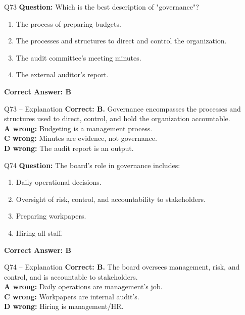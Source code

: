 \documentclass[aspectratio=169,10pt]{beamer}
\begin{document}
	\begin{frame}[t]{Q73}
		\small
		\textbf{Question:} Which is the best description of "governance"?
		\begin{enumerate}[label=\Alph*.,itemsep=1pt,topsep=2pt]
			\item The process of preparing budgets.
			\item The processes and structures to direct and control the organization.
			\item The audit committee's meeting minutes.
			\item The external auditor's report.
		\end{enumerate}
		\vspace{4pt}
		\textbf{Correct Answer: B}
	\end{frame}
	
	\begin{frame}[t]{Q73 -- Explanation}
		\small
		\textbf{Correct: B.} Governance encompasses the processes and structures used to direct, control, and hold the organization accountable. \\[4pt]
		\textbf{A wrong:} Budgeting is a management process. \\[2pt]
		\textbf{C wrong:} Minutes are evidence, not governance. \\[2pt]
		\textbf{D wrong:} The audit report is an output.
	\end{frame}
	
	\begin{frame}[t]{Q74}
		\small
		\textbf{Question:} The board's role in governance includes:
		\begin{enumerate}[label=\Alph*.,itemsep=1pt,topsep=2pt]
			\item Daily operational decisions.
			\item Oversight of risk, control, and accountability to stakeholders.
			\item Preparing workpapers.
			\item Hiring all staff.
		\end{enumerate}
		\vspace{4pt}
		\textbf{Correct Answer: B}
	\end{frame}
	
	\begin{frame}[t]{Q74 -- Explanation}
		\small
		\textbf{Correct: B.} The board oversees management, risk, and control, and is accountable to stakeholders. \\[4pt]
		\textbf{A wrong:} Daily operations are management's job. \\[2pt]
		\textbf{C wrong:} Workpapers are internal audit's. \\[2pt]
		\textbf{D wrong:} Hiring is management/HR.
	\end{frame}
	
\end{document}

